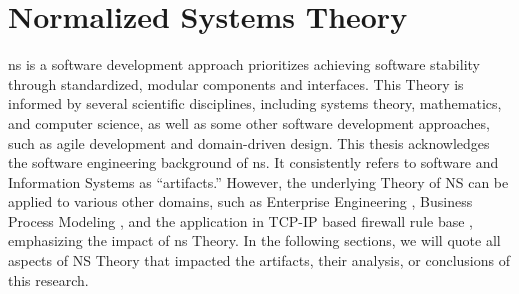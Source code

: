 \section{Normalized Systems Theory} \label{sec_ns_theory}

\gls{ns} is a software development approach prioritizes achieving software stability
through standardized, modular components and interfaces. This Theory is informed by
several scientific disciplines, including systems theory, mathematics, and computer
science, as well as some other software development approaches, such as agile development
and domain-driven design. This thesis acknowledges the software engineering background of
\gls{ns}. It consistently refers to software and Information Systems as
\enquote{artifacts.} However, the underlying Theory of NS can be applied to various other
domains, such as Enterprise Engineering \parencite{huysmans_towards_2013}, Business
Process Modeling \parencite{nuel_towards_2011}, and the application in TCP-IP based
firewall rule base \parencite{haerens_evolvability_2021}, emphasizing the impact of
\gls{ns} Theory. In the following sections, we will quote all aspects of NS Theory that
impacted the artifacts, their analysis, or conclusions of this research.






